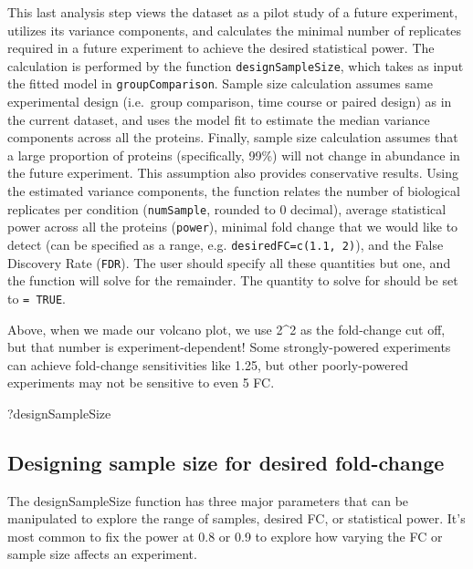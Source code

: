 \documentclass[]{book}
\newenvironment{Shaded}{\begin{snugshade}}{\end{snugshade}}
\newcommand{\NormalTok}[1]{#1}
\begin{document}
This last analysis step views the dataset as a pilot study of a future experiment, utilizes its variance components, and calculates the minimal number of replicates required in a future experiment to achieve the desired statistical power. The calculation is performed by the function \texttt{designSampleSize}, which takes as input the fitted model in \texttt{groupComparison}. Sample size calculation assumes same experimental design (i.e.~group comparison, time course or paired design) as in the current dataset, and uses the model fit to estimate the median variance components across all the proteins. Finally, sample size calculation assumes that a large proportion of proteins (specifically, 99\%) will not change in abundance in the future experiment. This assumption also provides conservative results.
Using the estimated variance components, the function relates the number of biological replicates per condition (\texttt{numSample}, rounded to 0 decimal), average statistical power across all the proteins (\texttt{power}), minimal fold change that we would like to detect (can be specified as a range, e.g. \texttt{desiredFC=c(1.1,\ 2)}), and the False Discovery Rate (\texttt{FDR}). The user should specify all these quantities but one, and the function will solve for the remainder. The quantity to solve for should be set to \texttt{=\ TRUE}.

Above, when we made our volcano plot, we use 2\^{}2 as the fold-change cut off, but that number is experiment-dependent! Some strongly-powered experiments can achieve fold-change sensitivities like 1.25, but other poorly-powered experiments may not be sensitive to even 5 FC.

\begin{Shaded}
\begin{Highlighting}[]
\NormalTok{?designSampleSize}
\end{Highlighting}
\end{Shaded}

\hypertarget{designing-sample-size-for-desired-fold-change}{%
\subsection{Designing sample size for desired fold-change}\label{designing-sample-size-for-desired-fold-change}}

The designSampleSize function has three major parameters that can be manipulated to explore the range of samples, desired FC, or statistical power. It's most common to fix the power at 0.8 or 0.9 to explore how varying the FC or sample size affects an experiment.
\end{document}
